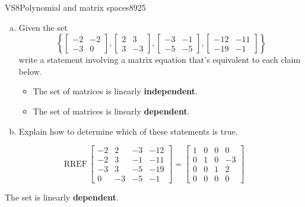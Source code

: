 \begin{exercise}{VS8}{Polynomial and matrix spaces}{8925} 
\begin{exerciseStatement} 

\begin{enumerate}[(a)]
\item  

 Given the set \[\left\{ \left[\begin{array}{cc}
-2 & -2 \\
-3 & 0
\end{array}\right] , \left[\begin{array}{cc}
2 & 3 \\
3 & -3
\end{array}\right] , \left[\begin{array}{cc}
-3 & -1 \\
-5 & -5
\end{array}\right] , \left[\begin{array}{cc}
-12 & -11 \\
-19 & -1
\end{array}\right] \right\}\] write a statement involving a matrix equation that's equivalent to each claim below. 

 

\begin{itemize}
\item  

 The set of matrices is linearly \textbf{independent}. 

 
\item  

 The set of matrices is linearly \textbf{dependent}. 

 
\end{itemize}

     
\item  

 Explain how to determine which of these statements is true. 

 
\end{enumerate}

     \end{exerciseStatement}
 \begin{exerciseAnswer} 

 \[
\mathrm{RREF}\, \left[\begin{array}{cccc}
-2 & 2 & -3 & -12 \\
-2 & 3 & -1 & -11 \\
-3 & 3 & -5 & -19 \\
0 & -3 & -5 & -1
\end{array}\right] = \left[\begin{array}{cccc}
1 & 0 & 0 & 0 \\
0 & 1 & 0 & -3 \\
0 & 0 & 1 & 2 \\
0 & 0 & 0 & 0
\end{array}\right]
            \] 

 

 The set is linearly \textbf{dependent}. 

 \end{exerciseAnswer}
 \end{exercise}


